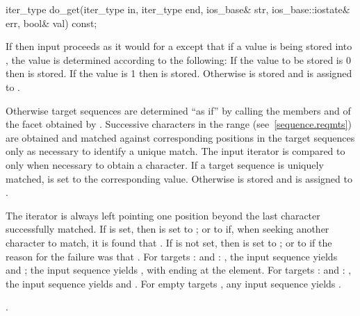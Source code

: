 %
%
\begin{itemdecl}
iter_type do_get(iter_type in, iter_type end, ios_base& str,
                 ios_base::iostate& err, bool& val) const;
\end{itemdecl}

\begin{itemdescr}
\pnum
\effects
If
then input proceeds as it would for a
except that if a value is being stored into ,
the value is determined according to the following:
If the value to be stored is 0 then
is stored.
If the value is 1
then
is stored.
Otherwise  is stored and  is assigned to .

\pnum
Otherwise target sequences are determined ``as if'' by calling the
members
and
of the facet obtained by
.
Successive characters in the range
(see~\ref{sequence.reqmts}) are obtained and
matched against corresponding positions in the target sequences only
as necessary to identify a unique match. The input iterator  is
compared to  only when necessary to obtain a character. If a target sequence is uniquely matched,  is set to the
corresponding value. Otherwise  is stored and  is assigned to .

\pnum
The  iterator is always left pointing one position beyond the last
character successfully matched. If  is set, then  is set to
;
or to
if, when seeking another character to match, it is found that
.
If  is not set, then  is set to
;
or to
if the reason for the failure was that
.
\enterexample
For targets
:
and
:
,
the input sequence
yields
and
;
the input sequence
yields
,
with  ending at the
element. For targets
:
and
:
, the input sequence  yields
and
.
For empty targets , any input sequence yields
.
\exitexample

\pnum
\returns
{}.
\end{itemdescr}

